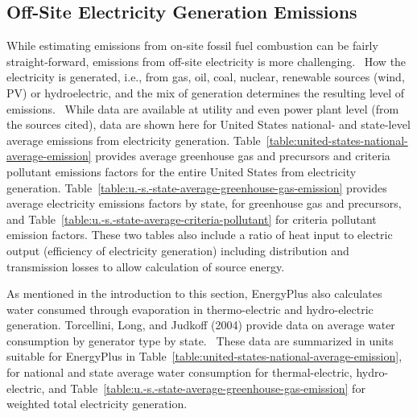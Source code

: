 \subsection{Off-Site Electricity Generation Emissions}\label{off-site-electricity-generation-emissions}

While estimating emissions from on-site fossil fuel combustion can be fairly straight-forward, emissions from off-site electricity is more challenging.~ How the electricity is generated, i.e., from gas, oil, coal, nuclear, renewable sources (wind, PV) or hydroelectric, and the mix of generation determines the resulting level of emissions.~ While data are available at utility and even power plant level (from the sources cited), data are shown here for United States national- and state-level average emissions from electricity generation. Table~\ref{table:united-states-national-average-emission} provides average greenhouse gas and precursors and criteria pollutant emissions factors for the entire United States from electricity generation. Table~\ref{table:u.-s.-state-average-greenhouse-gas-emission} provides average electricity emissions factors by state, for greenhouse gas and precursors, and Table~\ref{table:u.-s.-state-average-criteria-pollutant} for criteria pollutant emission factors. These two tables also include a ratio of heat input to electric output (efficiency of electricity generation) including distribution and transmission losses to allow calculation of source energy.

As mentioned in the introduction to this section, EnergyPlus also calculates water consumed through evaporation in thermo-electric and hydro-electric generation. Torcellini, Long, and Judkoff (2004) provide data on average water consumption by generator type by state.~ These data are summarized in units suitable for EnergyPlus in Table~\ref{table:united-states-national-average-emission}, for national and state average water consumption for thermal-electric, hydro-electric, and Table~\ref{table:u.-s.-state-average-greenhouse-gas-emission} for weighted total electricity generation.

